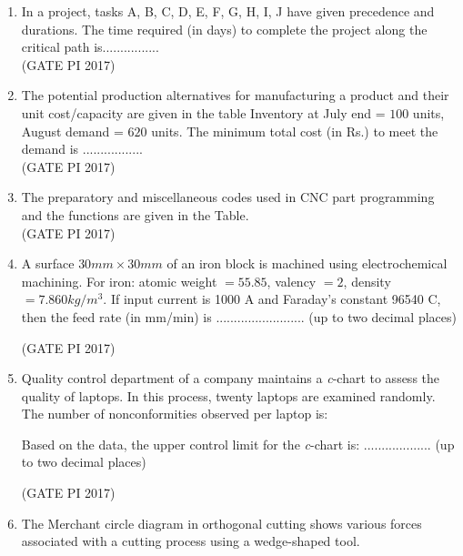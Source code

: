 \documentclass[journal,12pt,onecolumn]{IEEEtran}
\theoremstyle{remark}
\begin{document}
\begin{enumerate}
\item In a project, tasks A, B, C, D, E, F, G, H, I, J have given precedence and durations.  
The time required (in days) to complete the project along the critical path is................ \\


 
\hfill (GATE PI 2017)

\item The potential production alternatives for manufacturing a product and their unit cost/capacity are given in the table 
Inventory at July end = $100$ units, August demand = $620$ units.  
The minimum total cost (in Rs.) to meet the demand is .................\\



\hfill (GATE PI 2017)

\item The preparatory and miscellaneous codes used in CNC part programming and the functions are given in the Table. \\



\hfill (GATE PI 2017)

\item A surface $30 mm \times 30 mm$ of an iron block is machined using electrochemical machining.  
For iron: atomic weight $=55.85$, valency $= 2$, density $= 7.860 kg/m^3$.  
If input current is 1000 A and Faraday's constant 96540 C,  
then the feed rate (in mm/min) is ......................... (up to two decimal places)   

\hfill (GATE PI 2017)

\item Quality control department of a company maintains a \textit{c}-chart to assess the quality of laptops.  
In this process, twenty laptops are examined randomly. The number of nonconformities observed per laptop is: 



Based on the data, the upper control limit for the \textit{c}-chart is:  
................... (up to two decimal places) 

\hfill (GATE PI 2017)

\item The Merchant circle diagram in orthogonal cutting shows various forces associated with a cutting process using a wedge\--shaped tool.  


\end{enumerate}
\end{document}
